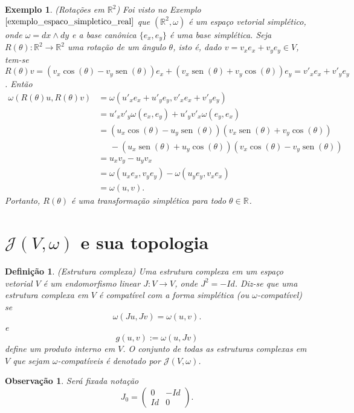 \documentclass[12pt]{book}
\newtheorem{definicao}[teorema]{Definição}
\newtheorem{exemplo}[teorema]{Exemplo}
\newtheorem{observacao}[teorema]{Observação}
\DeclareMathOperator{\sen}{sen}
\newcommand{\estruturacomplexa}{J_{0}}
\newcommand{\estruturascomplexaspadrao}{\mathcal{J}(V, \omega)}
\newcommand{\formaSimpletica}[2]{\omega(#1, #2)}
\newcommand{\real}[1]{\mathbb{R}^{#1}}
\newcommand{\reta}{\real{}}
\begin{document}
	\begin{exemplo}
		(Rotações em $\real{2}$) Foi visto no Exemplo $\ref{exemplo_espaco_simpletico_real}$ que $(\real{2}, \omega)$ é um espaço vetorial simplético, onde $\omega = dx\wedge dy$ e a base canônica $\{e_{x}, e_{y}\}$ é uma base simplética. Seja $R(\theta):\real{2}\to \real{2}$ uma rotação de um ângulo $\theta$, isto é, dado $v= v_{x}e_{x}+v_{y}e_{y} \in V$, tem-se $R(\theta)v = (v_{x}\cos(\theta)-v_{y}\sen(\theta))e_{x}+(v_{x}\sen(\theta)+v_{y}\cos(\theta))e_{y} = v'_{x}e_{x}+v'_{y}e_{y}$. Então
		$$
		\begin{aligned}
			\formaSimpletica{R(\theta)u}{R(\theta)v}&=
			\formaSimpletica{u'_{x}e_{x}+u'_{y}e_{y}}{v'_{x}e_{x}+v'_{y}e_{y}}
			\\
			&=u'_{x}v'_{y}\formaSimpletica{e_{x}}{e_{y}}	+u'_{y}v'_{x}\formaSimpletica{e_{y}}{e_{x}}
			\\
			&=(u_{x}\cos(\theta)-u_{y}\sen(\theta))(v_{x}\sen(\theta)+v_{y}\cos(\theta))
			\\
			&\;\;\;\;\;- (u_{x}\sen(\theta)+u_{y}\cos(\theta))(v_{x}\cos(\theta)-v_{y}\sen(\theta))
			\\
			&=u_{x}v_{y}-u_{y}v_{x}
			\\
			&=\formaSimpletica{u_{x}e_{x}}{v_{y}e_{y}} - \formaSimpletica{u_{y}e_{y}}{v_{x}e_{x}}
			\\
			&=\formaSimpletica{u}{v}.
		\end{aligned}
		$$
		Portanto, $R(\theta)$ é uma transformação simplética para todo $\theta \in \reta$.
	\end{exemplo}
	
	\section{$\estruturascomplexaspadrao$ e sua topologia}
	
	\begin{definicao}\label{definicao_estrutura_complexa}
		(Estrutura complexa) Uma estrutura complexa em um espaço vetorial $V$ é um endomorfismo linear $J: V \to V$, onde $J^{2} = -Id$. Diz-se que uma estrutura complexa em $V$ é compatível com a forma simplética (ou $\omega$-compatível) se 
		$$
		\omega(Ju,Jv)=\omega(u,v).
		$$
		e
		$$
		g(u,v):=\omega(u, Jv)
		$$
		define um produto interno em $V$. O conjunto de todas as estruturas complexas em $V$ que sejam $\omega$-compatíveis é denotado por $\estruturascomplexaspadrao$.
	\end{definicao}
	
	\begin{observacao}\label{observacao_estrutura_complexa}
		Será fixada notação
		$$
		\estruturacomplexa=
		\left(
		\begin{array}{cc}
		0 & -Id
		\\
		Id & 0
		\end{array}
		\right).
		$$
	\end{observacao}
	
\end{document}
